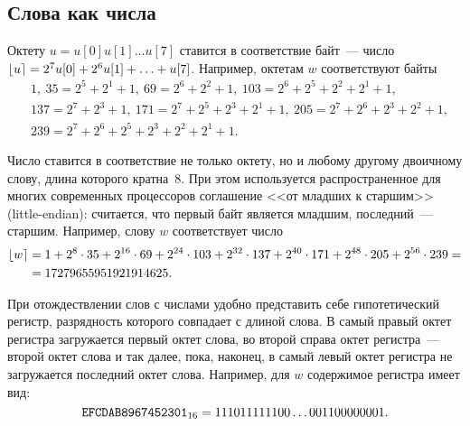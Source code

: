 \subsection{Слова как числа}

Октету $u=u[0]u[1]\ldots u[7]$ ставится в соответствие байт~--- 
число $\lfloor u\rceil=2^7u[0]+2^6 u[1]+\ldots + u[7]$. 
Например, октетам $w$ соответствуют байты
\begin{align*}
&
1,\ 
35=2^5+2^1+1,\ 
69=2^6+2^2+1,\ 
103=2^6+2^5+2^2+2^1+1,\\
%
&
137=2^7+2^3+1,\ 
171=2^7+2^5+2^3+2^1+1,\
205=2^7+2^6+2^3+2^2+1,\\
&
239=2^7+2^6+2^5+2^3+2^2+2^1+1.
\end{align*}

Число ставится в соответствие не только октету, но и любому другому
двоичному слову, длина которого кратна~$8$. 
%
При этом используется распространенное для многих современных 
процессоров соглашение <<от младших к старшим>> (little-endian):
считается, что первый байт является младшим, последний~--- старшим.
Например, слову $w$ соответствует число
\begin{align*}
\lfloor w\rceil&=
1 + 2^{8}\cdot 35 + 2^{16}\cdot 69 + 2^{24}\cdot 103 + 
2^{32}\cdot 137 + 2^{40}\cdot 171 + 2^{48}\cdot 205 + 2^{56}\cdot 239 =\\
& = 17279655951921914625.
\end{align*}

При отождествлении слов с числами удобно представить себе 
гипотетический регистр, разрядность которого совпадает с длиной слова.
В самый правый октет регистра загружается первый октет слова, 
во второй справа октет регистра~--- второй октет слова и так далее,
пока, наконец, в самый левый октет регистра не загружается последний 
октет слова.
%
Например, для $w$ содержимое регистра имеет 
вид:
$$
\hex{EFCDAB8967452301}
=
%
11101111 1100 \ldots 0011 00000001.
$$

